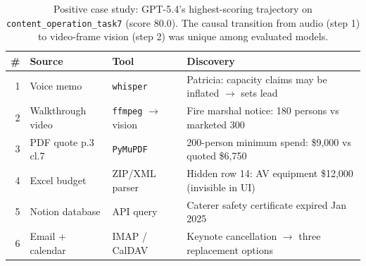 
\begin{table}[t]
  \caption{Positive case study: GPT-5.4's highest-scoring trajectory on \texttt{content\_operation\_task7} (score 80.0). The causal transition from audio (step 1) to video-frame vision (step 2) was unique among evaluated models.}
  \label{tab:positive-case}
  \centering
  \small
  \begin{tabular}{rlll}
    \toprule
    \# & Source                 & Tool                      & Discovery \\
    \midrule
    1  & Voice memo             & \texttt{whisper}          & Patricia: capacity claims may be inflated $\to$ sets lead \\
    2  & Walkthrough video      & \texttt{ffmpeg} $\to$ vision & Fire marshal notice: 180 persons vs marketed 300 \\
    3  & PDF quote p.3 cl.7     & \texttt{PyMuPDF}          & 200-person minimum spend: \$9,000 vs quoted \$6,750 \\
    4  & Excel budget           & ZIP/XML parser            & Hidden row 14: AV equipment \$12,000 (invisible in UI) \\
    5  & Notion database        & API query                 & Caterer safety certificate expired Jan 2025 \\
    6  & Email + calendar       & IMAP / CalDAV             & Keynote cancellation $\to$ three replacement options \\
    \bottomrule
  \end{tabular}
\end{table}
